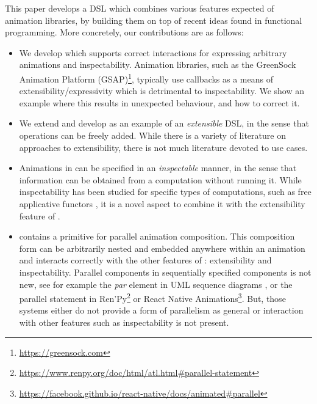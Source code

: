 This paper develops a DSL which combines various features expected of animation libraries, by building them on top of recent ideas found in functional programming. More concretely, our contributions are as follows:
\begin{itemize}
\item We develop \dsl{} which supports correct interactions for expressing arbitrary animations and inspectability. Animation libraries, such as the GreenSock Animation Platform (GSAP)\footnote{\url{https://greensock.com}}, typically use callbacks as a means of extensibility/expressivity which is detrimental to inspectability. We show an example where this results in unexpected behaviour, and how to correct it.
\item We extend and develop \dsl{} as an example of an \emph{extensible} DSL, in the sense that operations can be freely added. While there is a variety of literature on approaches to extensibility, there is not much literature devoted to use cases.
\item Animations in \dsl{} can be specified in an \emph{inspectable} manner, in the sense that information can be obtained from a computation without running it. While inspectability has been studied for specific types of computations, such as free applicative functors \cite{DBLP:journals/corr/CapriottiK14}, it is a novel aspect to combine it with the extensibility feature of \dsl{}.
\item \dsl{} contains a primitive for parallel animation composition. This composition form can be arbitrarily nested and embedded anywhere within an animation and interacts correctly with the other features of \dsl{}: extensibility and inspectability. Parallel components in sequentially specified components is not new, see for example the \emph{par} element in UML sequence diagrams \cite{umlspec}, or the parallel statement in Ren'Py\footnote{\url{https://www.renpy.org/doc/html/atl.html\#parallel-statement}} or React Native Animations\footnote{\url{https://facebook.github.io/react-native/docs/animated\#parallel}}. But, those systems either do not provide a form of parallelism as general or interaction with other features such as inspectability is not present.
\end{itemize}
